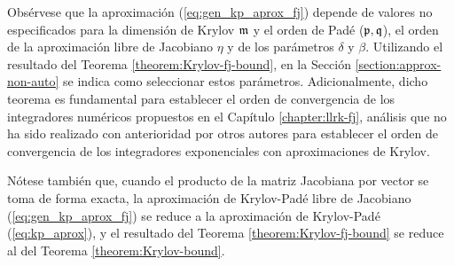 Obsérvese que la aproximación (\ref{eq:gen_kp_aprox_fj}) depende de valores no especificados para la dimensión de Krylov $\mathfrak{m}$ y el orden de Padé ($\mathfrak{p},\mathfrak{q}$), el orden de la aproximación libre de Jacobiano $\eta$ y de los parámetros $\delta$ y $\beta$. Utilizando el resultado del Teorema \ref{theorem:Krylov-fj-bound}, en la Sección \ref{section:approx-non-auto} se indica como seleccionar estos parámetros. Adicionalmente, dicho teorema es fundamental para establecer el orden de convergencia de los integradores numéricos propuestos en el Capítulo \ref{chapter:llrk-fj}, análisis que no ha sido realizado con anterioridad por otros autores para establecer el orden de convergencia de los integradores exponenciales con aproximaciones de Krylov.


Nótese también que, cuando el producto de la matriz Jacobiana por vector se toma de forma exacta, la aproximación de Krylov-Padé libre de Jacobiano (\ref{eq:gen_kp_aprox_fj}) se reduce a la aproximación de Krylov-Padé (\ref{eq:kp_aprox}), y el resultado del Teorema \ref{theorem:Krylov-fj-bound} se reduce al del Teorema \ref{theorem:Krylov-bound}.

